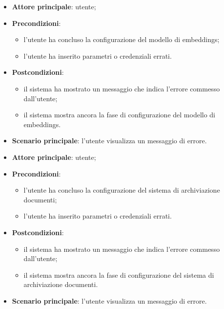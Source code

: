\documentclass[10pt, a4paper]{article}
\begin{document}
    \begin{itemize}
        \item \textbf{Attore principale}: utente;
        \item \textbf{Precondizioni}: 
            \begin{itemize}
                \item l’utente ha concluso la configurazione del modello di embeddings;
                \item l’utente ha inserito parametri o credenziali errati.
            \end{itemize}
        \item \textbf{Postcondizioni}: 
            \begin{itemize}
                \item il sistema ha mostrato un messaggio che indica l’errore commesso dall’utente;
                \item il sistema mostra ancora la fase di configurazione del modello di embeddings.
            \end{itemize}
        \item \textbf{Scenario principale}: l’utente visualizza un messaggio di errore.
    \end{itemize}

    \begin{itemize}
        \item \textbf{Attore principale}: utente;
        \item \textbf{Precondizioni}: 
            \begin{itemize}
                \item l’utente ha concluso la configurazione del sistema di archiviazione documenti;
                \item l’utente ha inserito parametri o credenziali errati.
            \end{itemize}
        \item \textbf{Postcondizioni}: 
            \begin{itemize}
                \item il sistema ha mostrato un messaggio che indica l’errore commesso dall’utente;
                \item il sistema mostra ancora la fase di configurazione del sistema di archiviazione documenti.
            \end{itemize}
        \item \textbf{Scenario principale}: l’utente visualizza un messaggio di errore.
    \end{itemize}
\end{document}
